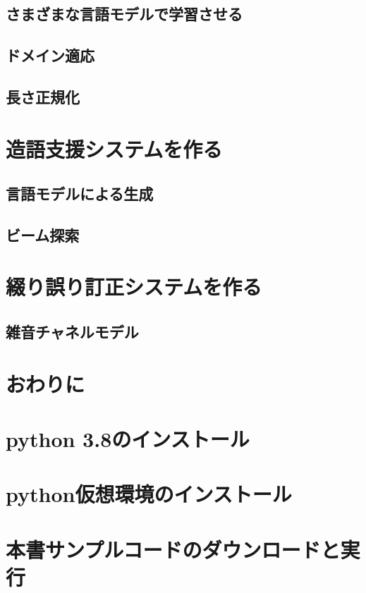 \documentclass[11pt]{report}
\begin{document}
\section{さまざまな言語モデルで学習させる}

\section{ドメイン適応}

\section{長さ正規化}

\chapter{造語支援システムを作る}

\section{言語モデルによる生成}

\section{ビーム探索}

\chapter{綴り誤り訂正システムを作る}

\section{雑音チャネルモデル}

\chapter{おわりに}

\appendix
\def\thesection{補遺\Alph{section}}

\chapter{python 3.8のインストール}

\chapter{python仮想環境のインストール}

\chapter{本書サンプルコードのダウンロードと実行}
\end{document}
